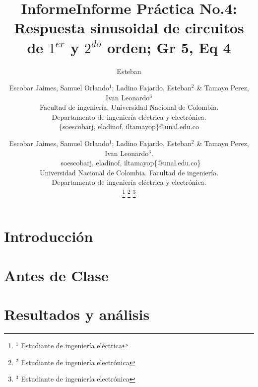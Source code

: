 \documentclass[twocolumn,11pts]{IEEEtran}
\author{Esteban}
\title{Informe}
\begin{document}
\renewcommand{\tablename}{TABLA}

\title{Informe Práctica No.4: Respuesta sinusoidal de circuitos de $1^{er}$ y $2^{do}$ orden; Gr 5, Eq 4}

\author{Escobar Jaimes, Samuel Orlando$^1$; Ladino Fajardo, Esteban$^2$ \& Tamayo Perez, Ivan Leonardo$^3$    \\
Facultad de ingeniería. Universidad Nacional de Colombia. \\
Departamento de ingeniería eléctrica y electrónica.\\
\{soescobarj, eladinof, iltamayop\}@unal.edu.co}
\author{ Escobar Jaimes, Samuel Orlando$^1$; Ladino Fajardo, Esteban$^2$ \& Tamayo Perez, Ivan Leonardo$^3$.
\\\
soescobarj, eladinof, iltamayop\{@unal.edu.co\}\\
Universidad Nacional de Colombia. Facultad de ingeniería.\\
Departamento de ingeniería eléctrica y electrónica. \\
\thanks{$^{1}$
        {\small Estudiante de ingeniería eléctrica}} 
\thanks{$^{2}$
        {\small Estudiante de ingeniería electrónica}}
\thanks{$^{3}$
        {\small Estudiante de ingeniería electrónica}}
}

\maketitle
\begin{abstract}
   
\end{abstract}
\begin{IEEEkeywords} 
\end{IEEEkeywords}



\section{Introducción}



\section{Antes de Clase}



\section{Resultados y análisis}
\end{document}
